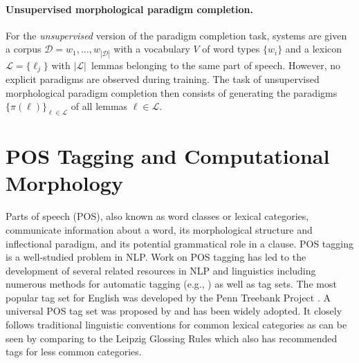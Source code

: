 \paragraph{Unsupervised morphological paradigm completion.} For the \textit{unsupervised} version of the paradigm completion task, systems are given a corpus $\mathcal{D}=w_1,\dots,w_{|\mathcal{D}|}$ with a vocabulary $V$ of word types $\{w_i\}$ and a lexicon $\mathcal{L} = \{\ell_j\}$ with $|\mathcal{L}|$~lemmas belonging to the same part of speech. However, no explicit paradigms are observed during training.
The task of unsupervised morphological paradigm completion then consists of
generating the paradigms~$\{\pi(\ell)\}_{\ell\in\mathcal{L}}$ of all lemmas $\ell \in \mathcal{L}$.




\section{POS Tagging and Computational Morphology}
\label{sec:POSlitreview}

Parts of speech (POS), also known as word classes or lexical categories, communicate information about a word, its morphological structure and inflectional paradigm, and its potential grammatical role in a clause. POS tagging is a well-studied problem in NLP. Work on POS tagging has led to the development of several related resources in NLP and linguistics including numerous methods for automatic tagging (e.g., \citet{kupiec_robust_1992,toutanova_bayesian_2008}) as well as tag sets. The most popular tag set for English was developed by the Penn Treebank Project \citep{penn_mitchell_1993}. A universal POS tag set was proposed by \citet{petrov_universal_2012} and has been widely adopted. It closely follows traditional linguistic conventions for common lexical categories as can be seen by comparing to the Leipzig Glossing Rules \citep{leipzig_2008} which also has recommended tags for less common categories.

